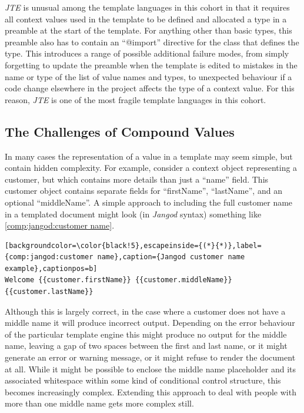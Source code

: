 \emph{JTE} is unusual among the \gls{template language}s in this cohort in that it requires all context values used in the template to be defined and allocated a type in a preamble at the start of the template. For anything other than basic types, this preamble also has to contain an \enquote{@import} directive for the class that defines the type. This introduces a range of possible additional failure modes, from simply forgetting to update the preamble when the template is edited to mistakes in the name or type of the list of value names and types, to unexpected behaviour if a code change elsewhere in the project affects the type of a context value. For this reason, \emph{JTE} is one of the most fragile \gls{template language}s in this cohort.

\subsection{The Challenges of Compound Values}

In many cases the representation of a value in a template may seem simple, but contain hidden complexity. For example, consider a context object representing a customer, but which contains more details than just a \enquote{name} field. This customer object contains separate fields for \enquote{firstName}, \enquote{lastName}, and an optional \enquote{middleName}. A simple approach to including the full customer name in a templated document might look (in \emph{Jangod} syntax) something like \autoref{comp:jangod:customer name}.

\begin{lstlisting}[backgroundcolor=\color{black!5},escapeinside={(*}{*)},label={comp:jangod:customer name},caption={Jangod customer name example},captionpos=b]
Welcome {{customer.firstName}} {{customer.middleName}} {{customer.lastName}}
\end{lstlisting}

Although this is largely correct, in the case where a customer does not have a middle name it will produce incorrect output. Depending on the error behaviour of the particular \gls{template engine} this might produce no output for the middle name, leaving a gap of two spaces between the first and last name, or it might generate an error or warning message, or it might refuse to render the document at all. While it might be possible to enclose the middle name placeholder and its associated whitespace within some kind of conditional control structure, this becomes increasingly complex. Extending this approach to deal with people with more than one middle name gets more complex still.

